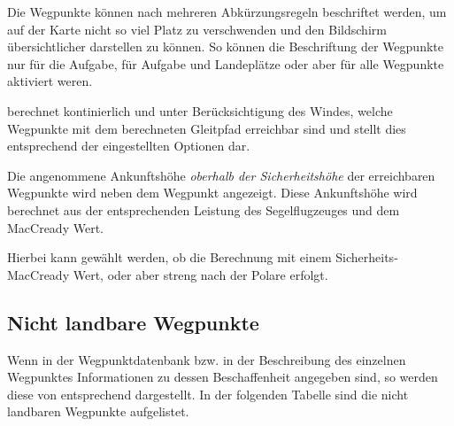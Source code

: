 Die Wegpunkte können nach mehreren Abkürzungsregeln beschriftet werden, um auf 
 der Karte nicht so viel Platz zu verschwenden und den Bildschirm übersichtlicher darstellen zu können. 
So können die Beschriftung der Wegpunkte nur für die Aufgabe, für Aufgabe und Landeplätze oder aber für alle Wegpunkte aktiviert weren.


\xc berechnet kontinierlich und unter Berücksichtigung des Windes, welche Wegpunkte mit dem berechneten Gleitpfad erreichbar sind und stellt dies entsprechend der eingestellten Optionen dar.

Die angenommene Ankunftshöhe {\em oberhalb der Sicherheitshöhe} der erreichbaren Wegpunkte wird neben dem Wegpunkt angezeigt. Diese Ankunftshöhe wird berechnet aus der entsprechenden Leistung des Segelflugzeuges und dem MacCready Wert. 

 Hierbei kann gewählt werden, ob die Berechnung mit einem Sicherheits-MacCready Wert, oder aber streng nach der Polare erfolgt.

\subsection*{Nicht landbare Wegpunkte}
Wenn in der Wegpunktdatenbank bzw. in der Beschreibung des einzelnen Wegpunktes Informationen zu dessen Beschaffenheit angegeben sind, so werden diese von \xc   entsprechend dargestellt. In der folgenden Tabelle sind die nicht landbaren Wegpunkte aufgelistet. 

